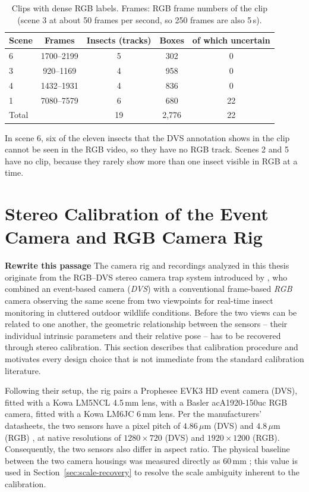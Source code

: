 \begin{table}[ht]
    \centering
    \caption{Clips with dense RGB labels. Frames: RGB frame numbers of the clip
    (scene 3 at about 50 frames per second, so 250 frames are also 5\,s).}
    \label{tab:data-dense}
    \small
    \begin{tabular}{lcccc}
        \hline
        Scene & Frames & Insects (tracks) & Boxes & of which uncertain \\
        \hline
        6 & 1700--2199 & 5 & 302 & 0 \\
        3 & 920--1169 & 4 & 958 & 0 \\
        4 & 1432--1931 & 4 & 836 & 0 \\
        1 & 7080--7579 & 6 & 680 & 22 \\
        \hline
        Total & & 19 & 2,776 & 22 \\
        \hline
    \end{tabular}
\end{table}

In scene 6, six of the eleven insects that the DVS annotation shows in the clip cannot be 
seen in the RGB video, so they have no RGB track. Scenes 2 and 5 have no clip, because they
rarely show more than one insect visible in RGB at a time.

\section{Stereo Calibration of the Event Camera and RGB Camera Rig}
\label{sec:stereo-calibration}

\textbf{Rewrite this passage} The camera rig and recordings analyzed in this thesis originate from the
RGB--DVS stereo camera trap system introduced by
\textcite{gebauer_towards_2024}, who combined an event-based camera
(\textit{DVS}) with a conventional frame-based \textit{RGB} camera observing the same
scene from two viewpoints for real-time insect monitoring in cluttered
outdoor wildlife conditions. Before the two views can be related to one
another, the geometric relationship between the sensors -- their individual
intrinsic parameters and their relative pose -- has to be recovered through
stereo calibration. This section describes that calibration procedure and
motivates every design choice that is not immediate from the standard
calibration literature.

Following their setup, the rig pairs a Prophesee EVK3 HD event camera (DVS), fitted with a 
Kowa LM5NCL 4.5\,mm lens, with a Basler acA1920-150uc RGB camera, fitted with a Kowa LM6JC
6\,mm lens. Per the manufacturers' datasheets, the two sensors have a pixel pitch
of $4.86\,\mu\text{m}$ (DVS) \parencite{prophesee_evk3hd_2024} and $4.8\,\mu\text{m}$ (RGB) 
\parencite{basler_aca1920_2026}, at native resolutions of $1280\times720$ (DVS) and 
$1920\times1200$ (RGB). Consequently, the two sensors also differ in aspect ratio. The 
physical baseline between the two camera housings was measured directly as $60\,\text{mm}$ 
\parencite{gebauer_towards_2024}; this value is used in Section~\ref{sec:scale-recovery} to
resolve the scale ambiguity inherent to the calibration.

